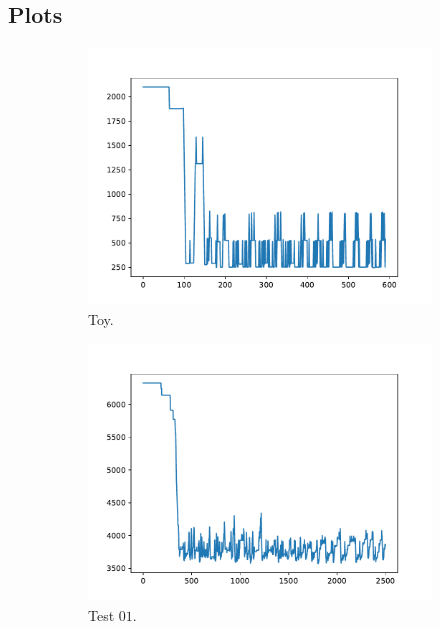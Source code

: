 \subsection{Plots}
\begin{figure}[h!]
    \centering
    \begin{subfigure}{0.45\textwidth}
        \includegraphics[width=\textwidth]{../logs/toy.pdf}
        \caption{Toy.}
    \end{subfigure}
    \begin{subfigure}{0.45\textwidth}
        \includegraphics[width=\textwidth]{../logs/test01.pdf}
        \caption{Test $01$.}
    \end{subfigure}
    \begin{subfigure}{0.45\textwidth}

\end{subfigure}
\end{figure}
